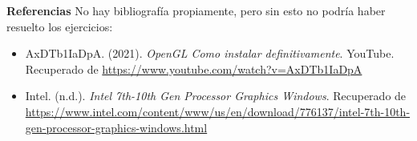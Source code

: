 \documentclass[a4paper,11pt]{article}                 %
\begin{document}
\vspace{1cm}
\noindent\textbf{Referencias}
\newline
No hay bibliografía propiamente, pero sin esto no podría haber resuelto los ejercicios:
\begin{itemize}
    \item AxDTb1IaDpA. (2021). \textit{OpenGL Como instalar definitivamente}. YouTube. Recuperado de \url{https://www.youtube.com/watch?v=AxDTb1IaDpA}
    \item Intel. (n.d.). \textit{Intel 7th-10th Gen Processor Graphics Windows}. Recuperado de \url{https://www.intel.com/content/www/us/en/download/776137/intel-7th-10th-gen-processor-graphics-windows.html}
\end{itemize}
\end{document}
